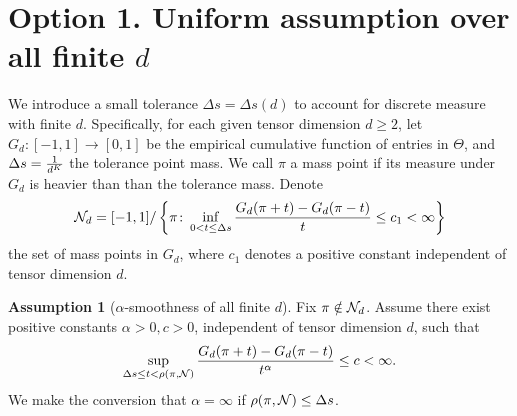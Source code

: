 \documentclass[10pt]{article}
\theoremstyle{definition}
\theoremstyle{definition}
\newtheorem{assumption}{Assumption}
\theoremstyle{definition}
\begin{document}
\section{Option 1. Uniform assumption over all finite $d$}
We introduce a small tolerance $\Delta s = \Delta s(d)$ to account for discrete measure with finite $d$. Specifically, for each given tensor dimension $d\geq 2$, let $G_d\colon[-1,1]\to[0,1]$ be the empirical cumulative function of entries in $\Theta$, and $\Delta s = {1\over d^K}$ the tolerance point mass. We call $\pi$ a mass point if its measure under $G_d$ is heavier than than the tolerance mass. Denote 
\begin{align}
\mathcal{N}_d=[-1,1]/\left\{\pi\colon \inf_{0<t\leq \Delta s}{G_d(\pi+t)-G_d(\pi-t) \over t} \leq c_1<\infty \right\}
\end{align}
the set of mass points in $G_d$, where $c_1$ denotes a positive constant independent of tensor dimension $d$.

\begin{assumption}[$\alpha$-smoothness of all finite $d$]
Fix $\pi\notin \mathcal{N}_d$. Assume there exist positive constants $\alpha>0, c>0$, independent of tensor dimension $d$, such that
\[
\sup_{\Delta s\leq  t< \rho(\pi,\mathcal{N})} {G_d(\pi+t)-G_d(\pi-t) \over t^\alpha} \leq c<\infty.
\]
We make the conversion that $\alpha=\infty$ if $\rho(\pi,\mathcal{N})\leq \Delta s$. 
\end{assumption}
\end{document}
